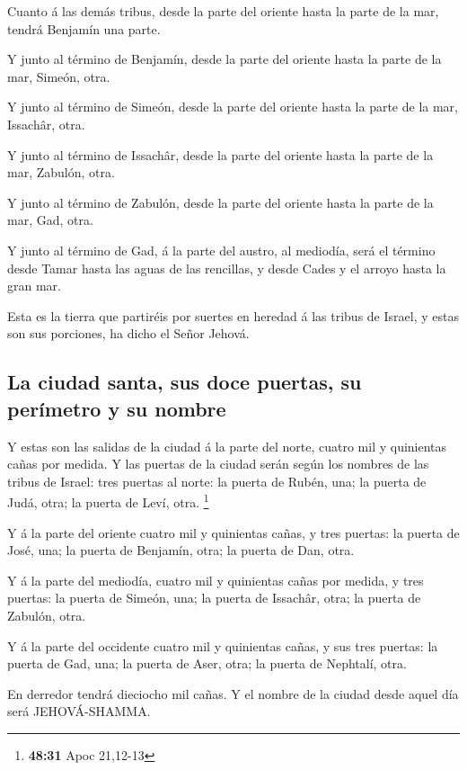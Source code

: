  Cuanto á las demás tribus, desde la parte del oriente
hasta la parte de la mar, tendrá Benjamín una parte.

 Y junto al término de Benjamín, desde la parte del
oriente hasta la parte de la mar, Simeón, otra.

 Y junto al término de Simeón, desde la parte del oriente
hasta la parte de la mar, Issachâr, otra.

 Y junto al término de Issachâr, desde la parte del
oriente hasta la parte de la mar, Zabulón, otra.

 Y junto al término de Zabulón, desde la parte del
oriente hasta la parte de la mar, Gad, otra.

 Y junto al término de Gad, á la parte del austro, al
mediodía, será el término desde Tamar hasta las aguas de las rencillas,
y desde Cades y el arroyo hasta la gran mar.

 Esta es la tierra que partiréis por suertes en heredad á
las tribus de Israel, y estas son sus porciones, ha dicho el Señor
Jehová.

\hypertarget{la-ciudad-santa-sus-doce-puertas-su-peruxedmetro-y-su-nombre}{%
\subsection{La ciudad santa, sus doce puertas, su perímetro y su
nombre}\label{la-ciudad-santa-sus-doce-puertas-su-peruxedmetro-y-su-nombre}}

 Y estas son las salidas de la ciudad á la parte del
norte, cuatro mil y quinientas cañas por medida.  Y las
puertas de la ciudad serán según los nombres de las tribus de Israel:
tres puertas al norte: la puerta de Rubén, una; la puerta de Judá, otra;
la puerta de Leví, otra. \footnote{\textbf{48:31} Apoc 21,12-13}

 Y á la parte del oriente cuatro mil y quinientas cañas,
y tres puertas: la puerta de José, una; la puerta de Benjamín, otra; la
puerta de Dan, otra.

 Y á la parte del mediodía, cuatro mil y quinientas cañas
por medida, y tres puertas: la puerta de Simeón, una; la puerta de
Issachâr, otra; la puerta de Zabulón, otra.

 Y á la parte del occidente cuatro mil y quinientas
cañas, y sus tres puertas: la puerta de Gad, una; la puerta de Aser,
otra; la puerta de Nephtalí, otra.

 En derredor tendrá dieciocho mil cañas. Y el nombre de
la ciudad desde aquel día será JEHOVÁ-SHAMMA.
